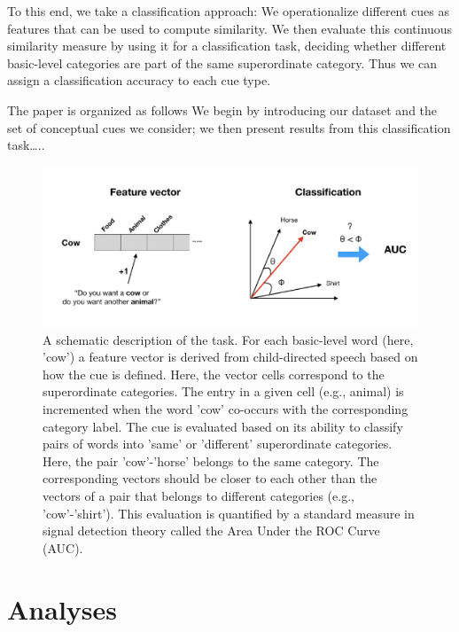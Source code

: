 \documentclass[english,,man,floatsintext]{apa6}
\begin{document}
To this end, we take a classification approach: We operationalize different cues as features that can be used to compute similarity. We then evaluate this continuous similarity measure by using it for a classification task, deciding whether different basic-level categories are part of the same superordinate category. Thus we can assign a classification accuracy to each cue type.

The paper is organized as follows We begin by introducing our dataset and the set of conceptual cues we consider; we then present results from this classification task\ldots{}..

\begin{figure}[h]

{\centering \includegraphics{cogsci_journal_files/figure-latex/task-1} 

}

\caption{\label{fig:task} A schematic description of the task. For each basic-level word (here, 'cow') a feature vector is derived from child-directed speech based on how the cue is defined. Here, the vector cells correspond to the superordinate categories. The entry in a given cell (e.g., animal) is incremented when the word 'cow' co-occurs with the corresponding category label. The cue is evaluated based on its ability to classify pairs of words into 'same' or 'different' superordinate categories. Here, the pair 'cow'-'horse' belongs to the same category. The corresponding vectors should be closer to each other than the vectors of a pair that belongs to different categories (e.g., 'cow'-'shirt'). This evaluation is quantified by a standard measure in signal detection theory called the Area Under the ROC Curve (AUC).}\label{fig:task}
\end{figure}

\hypertarget{analyses}{%
\section{Analyses}\label{analyses}}
\end{document}
